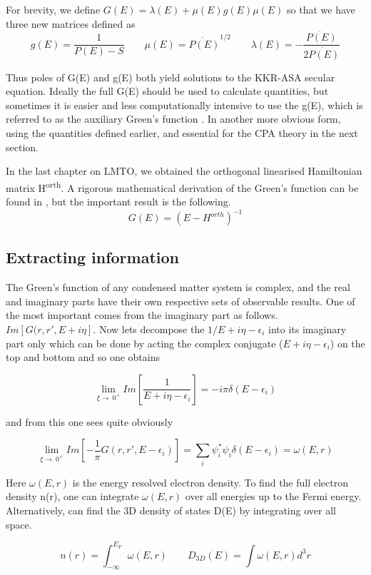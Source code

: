 \documentclass[12pt]{article}
\begin{document}
For brevity, we define $G(E)= \lambda(E) +\mu(E)g(E)\mu(E)$ so that we have three new matrices defined as
\begin{equation} \label{4.1} \tag{4.10}
g(E)=\frac{1}{P(E)-S} \qquad \mu(E)= \dot{P(E)}^{1/2} \qquad \lambda(E)=- \frac{\ddot{P(E)}}{2\dot{P(E)}}
\end{equation}


Thus poles of G(E) and g(E) both yield solutions to the KKR-ASA secular equation. Ideally the full G(E) should be used to calculate quantities, but sometimes it is easier and less computationally intensive to use the g(E), which is referred to as the auxiliary Green's function \cite{andersen}. In another more obvious form, using the quantities defined earlier, and essential for the CPA theory in the next section.

In the last chapter on LMTO, we obtained the orthogonal linearised Hamiltonian matrix H\textsuperscript{orth}. A rigorous mathematical derivation of the Green's function can be found in \cite{turek}, but the important result is the following.
$$G(E)=(E-H^{orth})^{-1}$$ 

\subsection{Extracting information}

The Green's function of any condensed matter system is complex, and the real and imaginary parts have their own respective sets of observable results. One of the most important comes from the imaginary part as follows. 
$Im[G(r,r',E+i\eta]$. Now lets decompose the $1/E+i\eta-\epsilon_i$ into its imaginary part only which can be done by acting the complex conjugate ($E+i\eta-\epsilon_i$) on the top and bottom and so one obtains 

$$\lim_{\xi\to\ 0^+}Im[\frac{1}{E+i\eta-\epsilon_i}]=-i\pi \delta(E-\epsilon_i)$$

and from this one sees quite obviously

$$\lim_{\xi\to\ 0^+}Im[-\frac{1}{\pi}G(r,r',E-\epsilon_i)]=\sum_i \psi^*_i\psi_i \delta(E-\epsilon_i)=\omega(E,r)$$

Here $\omega(E,r)$ is the energy resolved electron density. To find the full electron density n(r), one can integrate $\omega(E,r)$ over all energies up to the Fermi energy. Alternatively, can find the 3D density of states D(E) by integrating over all space. 

$$n(r)=\int_{-\infty}^{E_F}\omega(E,r) \qquad D_{3D}(E)=\int \omega(E,r) d^3r$$
\end{document}
